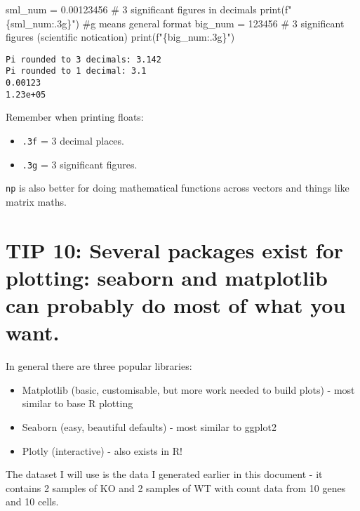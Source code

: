 \documentclass[
  letterpaper,
  DIV=11,
  numbers=noendperiod]{scrartcl}
\newenvironment{Shaded}{\begin{snugshade}}{\end{snugshade}}
\newcommand{\BuiltInTok}[1]{\textcolor[rgb]{0.00,0.23,0.31}{#1}}
\newcommand{\CommentTok}[1]{\textcolor[rgb]{0.37,0.37,0.37}{#1}}
\newcommand{\DecValTok}[1]{\textcolor[rgb]{0.68,0.00,0.00}{#1}}
\newcommand{\FloatTok}[1]{\textcolor[rgb]{0.68,0.00,0.00}{#1}}
\newcommand{\NormalTok}[1]{\textcolor[rgb]{0.00,0.23,0.31}{#1}}
\newcommand{\OperatorTok}[1]{\textcolor[rgb]{0.37,0.37,0.37}{#1}}
\newcommand{\SpecialCharTok}[1]{\textcolor[rgb]{0.37,0.37,0.37}{#1}}
\newcommand{\SpecialStringTok}[1]{\textcolor[rgb]{0.13,0.47,0.30}{#1}}
\providecommand{\tightlist}{%
  \setlength{\itemsep}{0pt}\setlength{\parskip}{0pt}}
\begin{document}
\begin{Shaded}
\begin{Highlighting}[]
\NormalTok{sml\_num }\OperatorTok{=} \FloatTok{0.00123456}
\CommentTok{\# 3 significant figures in decimals}
\BuiltInTok{print}\NormalTok{(}\SpecialStringTok{f"}\SpecialCharTok{\{}\NormalTok{sml\_num}\SpecialCharTok{:.3g\}}\SpecialStringTok{"}\NormalTok{) }\CommentTok{\#g means general format}
\NormalTok{big\_num }\OperatorTok{=} \DecValTok{123456}
\CommentTok{\# 3 significant figures (scientific notication)}
\BuiltInTok{print}\NormalTok{(}\SpecialStringTok{f"}\SpecialCharTok{\{}\NormalTok{big\_num}\SpecialCharTok{:.3g\}}\SpecialStringTok{"}\NormalTok{)}
\end{Highlighting}
\end{Shaded}

\begin{verbatim}
Pi rounded to 3 decimals: 3.142
Pi rounded to 1 decimal: 3.1
0.00123
1.23e+05
\end{verbatim}

Remember when printing floats:

\begin{itemize}
\tightlist
\item
  \texttt{.3f} = 3 decimal places.
\item
  \texttt{.3g} = 3 significant figures.
\end{itemize}

\texttt{np} is also better for doing mathematical functions across
vectors and things like matrix maths.

\section{TIP 10: Several packages exist for plotting: seaborn and
matplotlib can probably do most of what you
want.}\label{tip-10-several-packages-exist-for-plotting-seaborn-and-matplotlib-can-probably-do-most-of-what-you-want.}

In general there are three popular libraries:

\begin{itemize}
\tightlist
\item
  Matplotlib (basic, customisable, but more work needed to build plots)
  - most similar to base R plotting
\item
  Seaborn (easy, beautiful defaults) - most similar to ggplot2
\item
  Plotly (interactive) - also exists in R!
\end{itemize}

The dataset I will use is the data I generated earlier in this document
- it contains 2 samples of KO and 2 samples of WT with count data from
10 genes and 10 cells.
\end{document}
